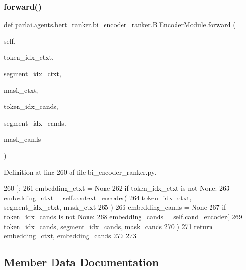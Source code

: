 \subsubsection{\texorpdfstring{forward()}{forward()}}
{\footnotesize\ttfamily def parlai.\+agents.\+bert\+\_\+ranker.\+bi\+\_\+encoder\+\_\+ranker.\+Bi\+Encoder\+Module.\+forward (\begin{DoxyParamCaption}\item[{}]{self,  }\item[{}]{token\+\_\+idx\+\_\+ctxt,  }\item[{}]{segment\+\_\+idx\+\_\+ctxt,  }\item[{}]{mask\+\_\+ctxt,  }\item[{}]{token\+\_\+idx\+\_\+cands,  }\item[{}]{segment\+\_\+idx\+\_\+cands,  }\item[{}]{mask\+\_\+cands }\end{DoxyParamCaption})}



Definition at line 260 of file bi\+\_\+encoder\+\_\+ranker.\+py.


\begin{DoxyCode}
260     ):
261         embedding\_ctxt = \textcolor{keywordtype}{None}
262         \textcolor{keywordflow}{if} token\_idx\_ctxt \textcolor{keywordflow}{is} \textcolor{keywordflow}{not} \textcolor{keywordtype}{None}:
263             embedding\_ctxt = self.context\_encoder(
264                 token\_idx\_ctxt, segment\_idx\_ctxt, mask\_ctxt
265             )
266         embedding\_cands = \textcolor{keywordtype}{None}
267         \textcolor{keywordflow}{if} token\_idx\_cands \textcolor{keywordflow}{is} \textcolor{keywordflow}{not} \textcolor{keywordtype}{None}:
268             embedding\_cands = self.cand\_encoder(
269                 token\_idx\_cands, segment\_idx\_cands, mask\_cands
270             )
271         \textcolor{keywordflow}{return} embedding\_ctxt, embedding\_cands
272 
273 
\end{DoxyCode}


\subsection{Member Data Documentation}
\mbox{\label{classparlai_1_1agents_1_1bert__ranker_1_1bi__encoder__ranker_1_1BiEncoderModule_a719af14e2b84f3a52eec12b94ff0c35f}} 
